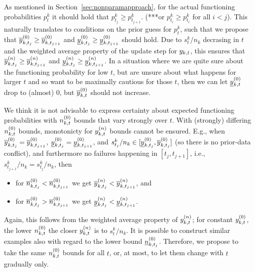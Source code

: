 \documentclass[12pt, a4paper]{elsarticle}
\newcommand{\ptk}{p^k_t}
\begin{document}
As mentioned in Section~\ref{sec:nonparamapproach}, for the actual functioning probabilities $\ptk$
it should hold that $p^k_{t_j} \ge p^k_{t_{j+1}}$. (***or $p^k_{t_i} \ge p^k_{t_i}$ for all $i < j$).
This naturally translates to conditions on the prior guess for $\ptk$,
such that we propose that 
$\overline{y}^{(0)}_{k,t_j} \ge \overline{y}^{(0)}_{k,t_{j+1}}$ and $\underline{y}^{(0)}_{k,t_j} \ge \underline{y}^{(0)}_{k,t_{j+1}}$ should hold.
Due to $s^k_t/n_k$ decrasing in $t$ and the weighted average property of the update step for $y_{k,t}$,
this ensures that 
$\overline{y}^{(n)}_{k,t_j} \ge \overline{y}^{(n)}_{k,t_{j+1}}$ and $\underline{y}^{(n)}_{k,t_j} \ge \underline{y}^{(n)}_{k,t_{j+1}}$.
In a situation where we are quite sure about the functioning probability for low $t$,
but are unsure about what happens for larger $t$ and so want to be maximally cautious for those $t$,
then we can let $\underline{y}^{(0)}_{k,t}$ drop to (almost) 0, but $\overline{y}^{(0)}_{k,t}$ should not increase.

We think it is not advisable to express certainty about expected functioning probabilities
with $n^{(0)}_{k,t}$ bounds that vary strongly over $t$.
With (strongly) differing $n^{(0)}_{k,t}$ bounds, monotonicty for $y^{(n)}_{k,t}$ bounds cannot be ensured.
E.g., when $\overline{y}^{(0)}_{k,t_j} = \overline{y}^{(0)}_{k,t_{j+1}}$, $\underline{y}^{(0)}_{k,t_j} = \underline{y}^{(0)}_{k,t_{j+1}}$,
and $s^k_{t_j}/n_k \in [\underline{y}^{(0)}_{k,t_j}, \overline{y}^{(0)}_{k,t_j}]$ (so there is no prior-data conflict),
and furthermore no failures happening in $[t_j, t_{j+1}]$, i.e., $s^k_{t_{j+1}}/n_k = s^k_{t_{j}}/n_k$, then
\begin{itemize}
\item for $\overline{n}^{(0)}_{k,t_j} < \overline{n}^{(0)}_{k,t_{j+1}}$ we get $\overline{y}^{(n)}_{k,t_j} < \overline{y}^{(n)}_{k,t_{j+1}}$, and
\item for $\overline{n}^{(0)}_{k,t_j} > \overline{n}^{(0)}_{k,t_{j+1}}$ we get $\underline{y}^{(n)}_{k,t_j} < \underline{y}^{(n)}_{k,t_{j+1}}$.
\end{itemize}
Again, this follows from the weighted average property of $y^{(n)}_{k,t}$;
for constant $y^{(0)}_{k,t}$, the lower $n^{(0)}_{k,t}$ the closer $y^{(n)}_{k,t}$ is to $s^k_t/n_k$.
It is possible to construct similar examples also with regard to the lower bound $\underline{n}^{(0)}_{k,t_j}$.
Therefore, we propose to take the same $n^{(0)}_{k,t}$ bounds for all $t$, or, at most, to let them change with $t$ gradually only.
\end{document}
